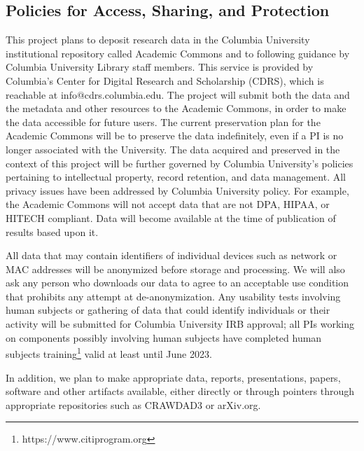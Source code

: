 \documentclass[11pt]{article}
\begin{document}
\subsection*{Policies for Access, Sharing, and Protection}

This project plans to deposit research data in the Columbia University institutional repository called Academic Commons and to following guidance by Columbia University Library staff members. This service is provided by Columbia's Center for Digital Research and Scholarship (CDRS), which is reachable at info@cdrs.columbia.edu. The project will submit both the data and the metadata and other resources to the Academic Commons, in order to make the data accessible for future users.  The current preservation plan for the Academic Commons will be to preserve the data indefinitely, even if a PI is no longer associated with the University. The data acquired and preserved in the context of this project will be further governed by Columbia University's policies pertaining to intellectual property, record retention, and data management. All privacy issues have been addressed by Columbia University policy. For example, the Academic Commons will not accept data that are not DPA, HIPAA, or HITECH compliant. Data will become available at the time of publication of results based upon it.

All data that may contain identifiers of individual devices such as network or MAC addresses will be anonymized before storage and processing. We will also ask any person who downloads our data to agree to an acceptable use condition that prohibits any attempt at de-anonymization. Any usability tests involving human subjects or gathering of data that could identify individuals or their activity will be submitted for Columbia University IRB approval; all PIs working on components possibly involving human subjects have completed human subjects training\footnote{https://www.citiprogram.org} valid at least until June 2023.

In addition, we plan to make appropriate data, reports, presentations, papers, software and other artifacts available, either directly or through pointers through appropriate repositories such as CRAWDAD3 or arXiv.org.
\end{document}
